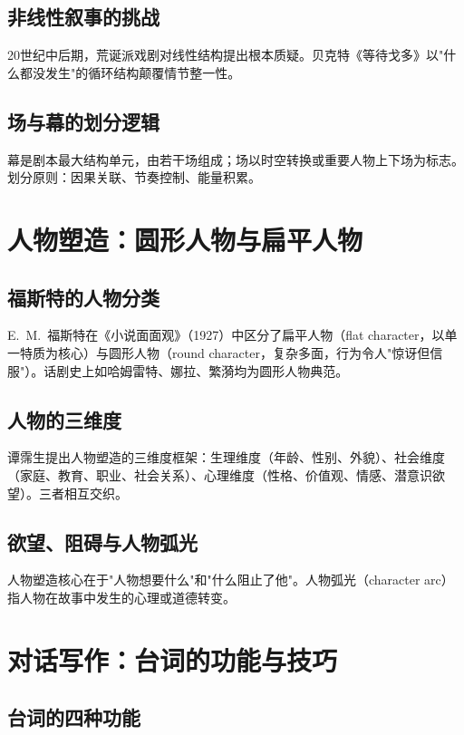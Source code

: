\subsection{非线性叙事的挑战}

20世纪中后期，荒诞派戏剧对线性结构提出根本质疑。贝克特《等待戈多》以"什么都没发生"的循环结构颠覆情节整一性。

\subsection{场与幕的划分逻辑}

幕是剧本最大结构单元，由若干场组成；场以时空转换或重要人物上下场为标志。划分原则：因果关联、节奏控制、能量积累。

\section{人物塑造：圆形人物与扁平人物}

\subsection{福斯特的人物分类}

E.\ M.\ 福斯特在《小说面面观》（1927）中区分了扁平人物（flat character，以单一特质为核心）与圆形人物（round character，复杂多面，行为令人"惊讶但信服"）\cite{forster:novel}。话剧史上如哈姆雷特、娜拉、繁漪均为圆形人物典范。

\subsection{人物的三维度}

谭霈生提出人物塑造的三维度框架\cite{tan:drama}：生理维度（年龄、性别、外貌）、社会维度（家庭、教育、职业、社会关系）、心理维度（性格、价值观、情感、潜意识欲望）。三者相互交织。

\subsection{欲望、阻碍与人物弧光}

人物塑造核心在于"人物想要什么"和"什么阻止了他"。人物弧光（character arc）指人物在故事中发生的心理或道德转变。

\section{对话写作：台词的功能与技巧}

\subsection{台词的四种功能}

